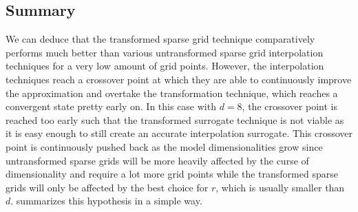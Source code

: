 \documentclass[
  a4paper,  %
  twoside,  %
  bibliography=totoc,
  headsepline,
  cleardoublepage=empty,
  parskip=half,
  draft=false
]{scrbook}
\begin{document}
\subsection{Summary}
We can deduce that the transformed sparse grid technique comparatively performs much better than various untransformed sparse grid interpolation techniques for a very low amount of grid points.
However, the interpolation techniques reach a crossover point at which they are able to continuously improve the approximation and overtake the transformation technique, which reaches a convergent state pretty early on.
In this case with $d=8$, the crossover point is reached too early such that the transformed surrogate technique is not viable as it is easy enough to still create an accurate interpolation surrogate.
This crossover point is continuously pushed back as the model dimensionalities grow since untransformed sparse grids will be more heavily affected by the curse of dimensionality and require a lot more grid points while the transformed sparse grids will only be affected by the best choice for $r$, which is usually smaller than $d$.
 summarizes this hypothesis in a simple way.
\end{document}
